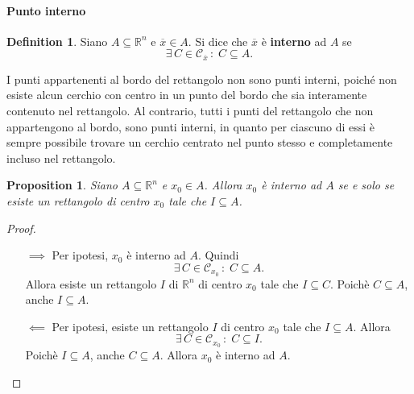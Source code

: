 \documentclass{article}
\theoremstyle{plain}
\newtheorem{prop}[thm]{Proposition}
\theoremstyle{definition}
\newtheorem{defn}{Definition}[section]
\theoremstyle{remark}
\begin{document}
\vspace{10pt}

\paragraph{Punto interno}
\begin{bxthm}
\begin{defn}
    Siano $A\subseteq\mathbb{R}^n$ e $\overline{x}\in A$. Si dice che $\overline{x}$ è \textbf{interno} ad $A$ se 
    \[\exists\,C\in\mathcal{C}_{\overline{x}}\,:\;C\subseteq A.\]
\end{defn}
\end{bxthm}

\vspace{10pt}

I punti appartenenti al bordo del rettangolo non sono punti interni, poiché non esiste alcun cerchio con centro in un punto del bordo che sia interamente contenuto nel rettangolo. 
Al contrario, tutti i punti del rettangolo che non appartengono al bordo, sono punti interni, in quanto per ciascuno di essi è sempre possibile trovare un cerchio centrato nel punto stesso e 
completamente incluso nel rettangolo.

\vspace{10pt}

\begin{bxthm}
\begin{prop}
    Siano $A\subseteq\mathbb{R}^n$ e $x_0\in A$.
    Allora $x_0$ è interno ad $A$ se e solo se esiste un rettangolo di centro $x_0$ tale che $I\subseteq A$.
\end{prop}
\end{bxthm}
\begin{proof}\hfill
    \begin{itemize}
        \item[$\implies$]
        Per ipotesi, $x_0$ è interno ad $A$. Quindi 
        \[\exists\,C\in\mathcal{C}_{x_0}\,:\;C\subseteq A.\]
        Allora esiste un rettangolo $I$ di $\mathbb{R}^n$ di centro $x_0$ tale che $I\subseteq C$. 
        Poichè $C\subseteq A$, anche $I\subseteq A$.
        \item[$\impliedby$] 
        Per ipotesi, esiste un rettangolo $I$ di centro $x_0$ tale che $I\subseteq A$. 
        Allora \[\exists\,C\in\mathcal{C}_{x_0}\,:\;C\subseteq I.\]
        Poichè $I\subseteq A$, anche $C\subseteq A$. Allora $x_0$ è interno ad $A$.
    \end{itemize}
\end{proof}
\end{document}
